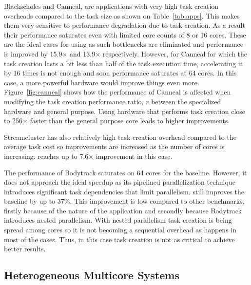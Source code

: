 Blackscholes and Canneal, are applications with very high task creation overheads compared to the task size as shown on Table~\ref{tab.apps}.
This makes them very sensitive to performance degradation due to task creation. 
As a result their performance saturates even with limited core counts of 8 or 16 cores.
These are the ideal cases for using {\proposal} as such bottlenecks are eliminated and performance is improved by 15.9$\times$ and 13.9$\times$ respectively.
However, for Canneal for which the task creation lasts a bit less than half of the task execution time, accelerating it by 16 times is not enough and soon performance saturates at 64 cores. 
In this case, a more powerful hardware would improve things even more.
Figure~\ref{fig:canneal} shows how the performance of Canneal is affected when modifying the task creation performance ratio, $r$ between the specialized hardware and general purpose.
Using hardware that performs task creation close to 256$\times$ faster than the general purpose core leads to higher improvements.

Streamcluster has also relatively high task creation overhead compared to the average task cost so improvements are increased as the number of cores is increasing.
{\proposal} reaches up to 7.6$\times$ improvement in this case.

The performance of Bodytrack saturates on 64 cores for the baseline. 
However, it does not approach the ideal speedup as its pipelined parallelization technique introduces significant task dependencies that limit parallelism.
{\proposal} still improves the baseline by up to 37\%.
This improvement is low compared to other benchmarks, firstly because of the nature of the application and secondly because Bodytrack introduces nested parallelism.
With nested parallelism task creation is being spread among cores so it is not becoming a sequential overhead as happens in most of the cases.
Thus, in this case task creation is not as critical to achieve better results.


\subsection{Heterogeneous Multicore Systems}

